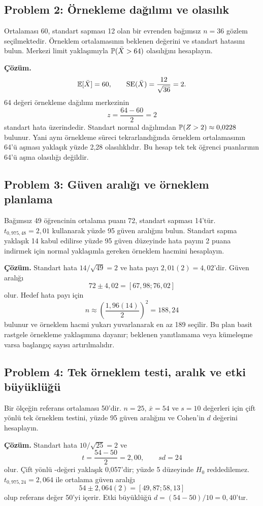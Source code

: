 \subsection*{Problem 2: Örnekleme dağılımı ve olasılık}

Ortalaması 60, standart sapması 12 olan bir evrenden bağımsız $n=36$
gözlem seçilmektedir. Örneklem ortalamasının beklenen değerini ve standart
hatasını bulun. Merkezi limit yaklaşımıyla $\P(\bar X>64)$ olasılığını
hesaplayın.

\textbf{Çözüm.}
\[
\E[\bar X]=60,
\qquad
\SE(\bar X)=\frac{12}{\sqrt{36}}=2.
\]
64 değeri örnekleme dağılımı merkezinin
\[
z=\frac{64-60}{2}=2
\]
standart hata üzerindedir. Standart normal dağılımdan
$\P(Z>2)\approx0{,}0228$ bulunur. Yani aynı örnekleme süreci tekrarlandığında
örneklem ortalamasının 64'ü aşması yaklaşık yüzde 2,28 olasılıklıdır. Bu
hesap tek tek öğrenci puanlarının 64'ü aşma olasılığı değildir.

\subsection*{Problem 3: Güven aralığı ve örneklem planlama}

Bağımsız 49 öğrencinin ortalama puanı 72, standart sapması 14'tür.
$t_{0{,}975,48}=2{,}01$ kullanarak yüzde 95 güven aralığını bulun. Standart
sapma yaklaşık 14 kabul edilirse yüzde 95 güven düzeyinde hata payını 2 puana
indirmek için normal yaklaşımla gereken örneklem hacmini hesaplayın.

\textbf{Çözüm.} Standart hata $14/\sqrt{49}=2$ ve hata payı
$2{,}01(2)=4{,}02$'dir. Güven aralığı
\[
72\pm4{,}02=[67{,}98;76{,}02]
\]
olur. Hedef hata payı için
\[
n\approx\left(\frac{1{,}96(14)}{2}\right)^2
=188{,}24
\]
bulunur ve örneklem hacmi yukarı yuvarlanarak en az 189 seçilir. Bu plan basit
rastgele örnekleme yaklaşımına dayanır; beklenen yanıtlamama veya kümeleşme
varsa başlangıç sayısı artırılmalıdır.

\subsection*{Problem 4: Tek örneklem testi, aralık ve etki büyüklüğü}

Bir ölçeğin referans ortalaması 50'dir. $n=25$, $\bar x=54$ ve $s=10$
değerleri için çift yönlü tek örneklem \tstat testini, yüzde 95 güven aralığını ve
Cohen'in $d$ değerini hesaplayın.

\textbf{Çözüm.} Standart hata $10/\sqrt{25}=2$ ve
\[
t=\frac{54-50}{2}=2{,}00,\qquad sd=24
\]
olur. Çift yönlü \pval-değeri yaklaşık 0,057'dir; yüzde 5 düzeyinde $H_0$
reddedilemez. $t_{0{,}975,24}=2{,}064$ ile ortalama güven aralığı
\[
54\pm2{,}064(2)=[49{,}87;58{,}13]
\]
olup referans değer 50'yi içerir. Etki büyüklüğü
$d=(54-50)/10=0{,}40$'tır.

